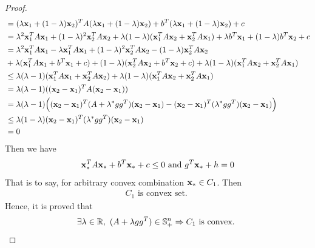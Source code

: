 \documentclass[11pt,a4paper]{article}
\begin{document}
\begin{proof}
\begin{align}
        & = (\lambda \mathbf{x}_{1} + (1-\lambda) \mathbf{x}_{2})^{T} A (\lambda \mathbf{x}_{1} + (1-\lambda) \mathbf{x}_{2}) + b^T (\lambda \mathbf{x}_{1} + (1-\lambda) \mathbf{x}_{2}) + c \\
        & = \lambda^2 \mathbf{x}_{1}^{T} A \mathbf{x}_{1} + (1-\lambda)^2 \mathbf{x}_{2}^{T} A \mathbf{x}_{2} 
        + \lambda(1-\lambda) (\mathbf{x}_{1}^{T} A \mathbf{x}_{2} + \mathbf{x}_{2}^{T} A \mathbf{x}_{1})
        + \lambda b^T \mathbf{x}_{1} + (1-\lambda) b^T \mathbf{x}_{2} + c \\
        & = \lambda^2 \mathbf{x}_{1}^{T} A \mathbf{x}_{1} - \lambda \mathbf{x}_{1}^{T} A \mathbf{x}_{1} 
        + (1-\lambda)^2 \mathbf{x}_{2}^{T} A \mathbf{x}_{2} - (1-\lambda) \mathbf{x}_{2}^{T} A \mathbf{x}_{2}
        \nonumber \\
        & + \lambda(\mathbf{x}_{1}^{T} A \mathbf{x}_{1} + b^T \mathbf{x}_{1} + c) + (1-\lambda)(\mathbf{x}_{2}^{T} A \mathbf{x}_{2} + b^T \mathbf{x}_{2} + c) 
        + \lambda(1-\lambda) (\mathbf{x}_{1}^{T} A \mathbf{x}_{2} + \mathbf{x}_{2}^{T} A \mathbf{x}_{1}) \\
        & \leq \lambda (\lambda - 1) (\mathbf{x}_{1}^{T} A \mathbf{x}_{1} + \mathbf{x}_{2}^{T} A \mathbf{x}_{2}) 
        + \lambda(1-\lambda) (\mathbf{x}_{1}^{T} A \mathbf{x}_{2} + \mathbf{x}_{2}^{T} A \mathbf{x}_{1}) \\
        & = \lambda(\lambda - 1) ((\mathbf{x}_{2} - \mathbf{x}_{1})^{T} A (\mathbf{x}_{2} - \mathbf{x}_{1})) \\
        & = \lambda(\lambda - 1) \Big( (\mathbf{x}_{2} - \mathbf{x}_{1})^{T} (A + \lambda^{*} gg^T) (\mathbf{x}_{2} - \mathbf{x}_{1})
        - (\mathbf{x}_{2} - \mathbf{x}_{1})^{T} (\lambda^{*} gg^T) (\mathbf{x}_{2} - \mathbf{x}_{1}) \Big) \\
        & \leq \lambda(1 - \lambda) (\mathbf{x}_{2} - \mathbf{x}_{1})^{T} (\lambda^{*} gg^T) (\mathbf{x}_{2} - \mathbf{x}_{1})  \\
        & = 0
    \end{align}
    Then we have 
    \begin{align}
        \mathbf{x}_{*}^{T} A \mathbf{x}_{*} + b^T \mathbf{x}_{*} + c \leq 0 \text{ and } g^T \mathbf{x}_{*} + h = 0 
    \end{align}
    That is to say, for arbitrary convex combination $\mathbf{x}_{*} \in C_1$. Then 
    \begin{align}
        C_1 \text{ is convex set. }
    \end{align}
    Hence, it is proved that 
    \begin{align}
        \exists \lambda \in \mathbb{R},\ (A + \lambda gg^T) \in \mathbb{S}_{+}^{n} \Rightarrow C_1
        \text{ is convex. }
    \end{align}
\end{proof}

\newpage
\end{document}
